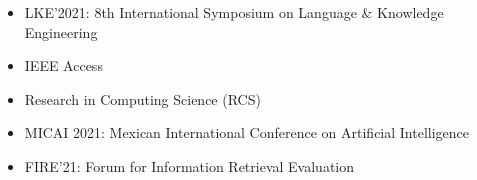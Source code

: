 \begin{itemize}
  \item LKE'2021: 8th International Symposium on Language \& Knowledge Engineering
  \item IEEE Access
  \item Research in Computing Science (RCS)
   \item MICAI 2021: Mexican International Conference on Artificial Intelligence
    \item FIRE'21: Forum for Information Retrieval Evaluation

\end{itemize}











